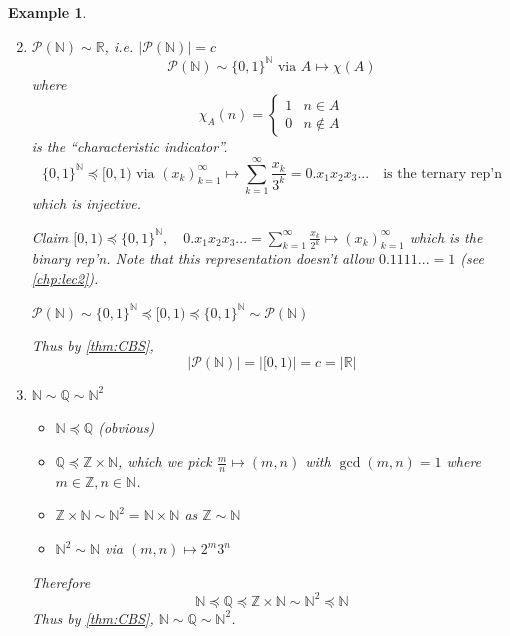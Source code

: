 \documentclass[11pt, oneside]{book}
\theoremstyle{break}
\newtheorem{eg}{Example}[section]
\newcommand{\bb}[1]{\mathbb{#1}}			%
\begin{document}
\begin{eg}
	\begin{enumerate}
		\setcounter{enumi}{1}
		\item $\mathcal{P}(\bb{N}) \sim \bb{R}$, i.e. $|\mathcal{P}(\bb{N})| = c$
			\begin{equation}
				\mathcal{P}(\bb{N}) \sim \{0, 1\}^{\bb{N}} \text{ via } A \mapsto \chi(A)
			\end{equation}
			where
			\begin{equation}
				\chi_A(n) = 
					\begin{cases}
						1 & n \in A \\
						0 & n \notin A
					\end{cases}
			\end{equation}
			is the ``characteristic indicator''.
			\begin{equation}
				\{0, 1\}^{\bb{N}} \preceq [0, 1) \text{ via } (x_k)_{k=1}^\infty \mapsto \sum_{k=1}^{\infty} \frac{x_k}{3^k} = 0.x_1 x_2 x_3 ... \quad \text{is the ternary rep'n}
			\end{equation}
			which is injective.

			Claim $[0, 1) \preceq \{0, 1\}^{\bb{N}}, \quad 0.x_1 x_2 x_3 ... = \sum_{k=1}^{\infty} \frac{x_k}{2^k} \mapsto (x_k)_{k = 1}^\infty$ which is the binary rep'n. Note that this representation doesn't allow $0.1111... = 1$ (see \autoref{chp:lec2}).

			$\mathcal{P}(\bb{N}) \sim \{0, 1\}^{\bb{N}} \preceq [0, 1) \preceq \{0, 1\}^{\bb{N}} \sim \mathcal{P}(\bb{N})$

			Thus by \autoref{thm:CBS},
			\begin{equation}
				|\mathcal{P}(\bb{N})| = |[0, 1)| = c = |\bb{R}|
			\end{equation}

		\item $\bb{N} \sim \bb{Q} \sim \bb{N}^2$
			\begin{itemize}
				\item $\bb{N} \preceq \bb{Q}$ (obvious)
				\item $\bb{Q} \preceq \bb{Z} \times \bb{N}$, which we pick $\frac{m}{n} \mapsto (m, n)$ with $\gcd(m, n) = 1$ where $m \in \bb{Z}, n \in \bb{N}$.
				\item $\bb{Z} \times \bb{N} \sim \bb{N}^2 = \bb{N} \times \bb{N}$ as $\bb{Z} \sim \bb{N}$
				\item $\bb{N}^2 \sim \bb{N}$ via $(m, n) \mapsto 2^m 3^n$
			\end{itemize}
			Therefore
			\begin{equation}
				\bb{N} \preceq \bb{Q} \preceq \bb{Z} \times \bb{N} \sim \bb{N}^2 \preceq \bb{N}
			\end{equation}
			Thus by \autoref{thm:CBS}, $\bb{N} \sim \bb{Q} \sim \bb{N}^2$.

	\end{enumerate}
\end{eg}
\end{document}
